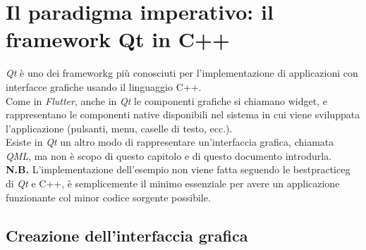 \section{Il paradigma imperativo: il framework Qt in C++}
\label{sec:paradigma-imperativo-qt-cpp}

\emph{Qt} è uno dei \gls{frameworkg} più conosciuti per l'implementazione di applicazioni con interfacce grafiche usando il linguaggio C++.\\
Come in \emph{Flutter}, anche in \emph{Qt} le componenti grafiche si chiamano widget, e rappresentano le componenti native disponibili nel sistema in cui viene sviluppata l'applicazione (pulsanti, menu, caselle di testo, ecc.).\\
Esiste in \emph{Qt} un altro modo di rappresentare un'interfaccia grafica, chiamata \emph{QML}, ma non è scopo di questo capitolo e di questo documento introdurla.\\
\textbf{N.B.} L'implementazione dell'esempio non viene fatta seguendo le \gls{bestpracticeg} di \emph{Qt} e C++, è semplicemente il minimo essenziale per avere un applicazione funzionante col minor codice sorgente possibile.

\subsection{Creazione dell'interfaccia grafica}
\label{subsec:creazione-ui-qt}

